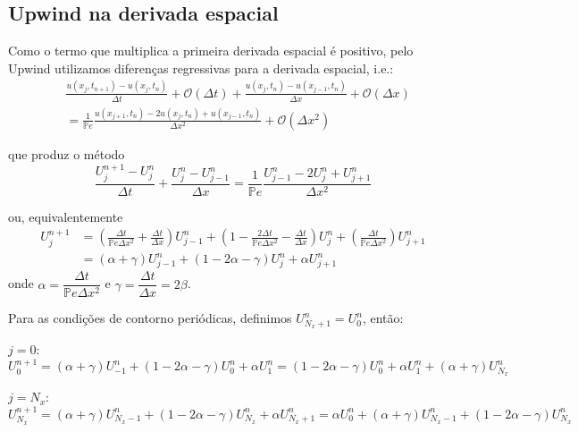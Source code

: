\documentclass[12pt, a4paper]{article}
\newcommand{\bb}[1]{\mathbb{#1}}
\newcommand{\D}[1]{\Delta#1}
\renewcommand{\O}[1]{\mathcal{O} (#1)}
\begin{document}
    \subsection{Upwind na derivada espacial}
    Como o termo que multiplica a primeira derivada espacial é positivo, pelo Upwind utilizamos diferenças regressivas para a derivada espacial, i.e.:
    \begin{equation}
        \begin{split}
            &\frac{u(x_j,t_{n+1})-u(x_j,t_n)}{\D{t}} + \O{\D{t}} + \frac{u(x_{j},t_n)-u(x_{j-1},t_n)}{\D{x}} + \O{\D{x}}
            \\&= \frac{1}{\bb{P}e} \frac{u(x_{j+1},t_n)-2u(x_j,t_n)+u(x_{j-1},t_n)}{\D{x}^2} + \O{\D{x}^2}
        \end{split}
    \end{equation}

    que produz o método
    \begin{equation}
        \frac{U_j^{n+1}-U_j^n}{\D{t}} + \frac{U_j^n-U_{j-1}^n}{\D{x}} = \frac{1}{\bb{P}e} \frac{U_{j-1}^n-2U_j^n+U_{j+1}^n}{\D{x}^2}
    \end{equation}

    ou, equivalentemente
    \begin{equation}
        \begin{split}
            U_j^{n+1} &= \left(\frac{\D{t}}{\bb{P}e\D{x}^2}+\frac{\D{t}}{\D{x}}\right)U_{j-1}^n + \left(1-\frac{2\D{t}}{\bb{P}e\D{x}^2}-\frac{\D{t}}{\D{x}}\right)U_j^n + \left(\frac{\D{t}}{\bb{P}e\D{x}^2}\right)U_{j+1}^n\\[.2cm]
            &= (\alpha+\gamma)U_{j-1}^n + (1-2\alpha-\gamma)U_j^n + \alpha U_{j+1}^n
        \end{split}
    \end{equation}
    onde $\alpha = \dfrac{\D{t}}{\bb{P}e\D{x^2}}$ e $\gamma = \dfrac{\D{t}}{\D{x}} = 2\beta$.

    \vspace{.3cm}

    Para as condições de contorno periódicas, definimos $U_{N_x+1}^n = U_0^n$, então:

    $j = 0$:
    \[U_0^{n+1} = (\alpha+\gamma)U_{-1}^n + (1-2\alpha-\gamma)U_0^n + \alpha U_{1}^n = (1-2\alpha-\gamma)U_0^n + \alpha U_{1}^n + (\alpha+\gamma)U_{N_x}^n\]

    $j = N_x$:
    \[U_{N_x}^{n+1} = (\alpha+\gamma)U_{N_x-1}^n + (1-2\alpha-\gamma)U_{N_x}^n + \alpha U_{N_x+1}^n = \alpha U_{0}^n + (\alpha+\gamma)U_{N_x-1}^n + (1-2\alpha-\gamma)U_{N_x}^n\]
\end{document}
